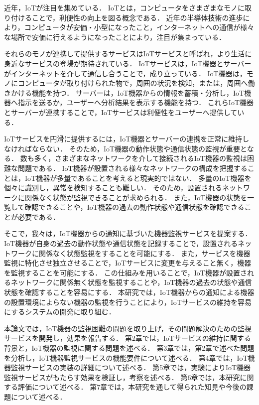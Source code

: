 
近年，IoTが注目を集めている．
IoTとは，コンピュータをさまざまなモノに取り付けることで，利便性の向上を図る概念である．
近年の半導体技術の進歩により，コンピュータが安価・小型になったこと，インターネットへの通信が様々な場所で安価に行えるようになったことにより，注目が集まっている．
\medskip

それらのモノが連携して提供するサービスはIoTサービスと呼ばれ，より生活に身近なサービスの登場が期待されている．
IoTサービスは，IoT機器とサーバーがインターネットを介して通信し合うことで，成り立っている．
IoT機器は，モノにコンピュータが取り付けられた物で，周囲の状況を検知，または，周囲へ働きかける機能を持つ．
サーバーは，IoT機器からの情報を蓄積・分析し，IoT機器へ指示を送るか，ユーザーへ分析結果を表示する機能を持つ．
これらIoT機器とサーバーが連携することで，IoTサービスは利便性をユーザーへ提供している．
\medskip

IoTサービスを円滑に提供するには，IoT機器とサーバーの連携を正常に維持しなければならない．
そのため，IoT機器の動作状態や通信状態の監視が重要となる．
数も多く，さまざまなネットワークを介して接続されるIoT機器の監視は困難な問題である．
IoT機器が設置される様々なネットワークの構成を把握することは，IoT機器が多量であることを考えると現実的ではない．
多量のIoT機器を個々に識別し，異常を検知することも難しい．
そのため，設置されるネットワークに関係なく状態が監視できることが求められる．
また，IoT機器の状態を一覧して確認できることや，IoT機器の過去の動作状態や通信状態を確認できることが必要である．
\medskip

そこで，我々は，IoT機器からの通知に基づいた機器監視サービスを提案する．
IoT機器が自身の過去の動作状態や通信状態を記録することで，設置されるネットワークに関係なく状態監視をすることを可能にする．
また，サービスを機器監視に特化させ独立させることで，IoTサービスに変更を与えること無く，機器を監視することを可能にする．
この仕組みを用いることで，IoT機器が設置されるネットワークに関係無く状態を監視することや，IoT機器の過去の状態や通信状態を確認することを容易にする．
本研究では，IoT機器からの通知による機器の設置環境によらない機器の監視を行うことにより，IoTサービスの維持を容易にするシステムの開発に取り組む．
\medskip

本論文では，IoT機器の監視困難の問題を取り上げ，その問題解決のための監視サービスを開発し，効果を報告する．
第2章では，IoTサービスの維持に関する背景と，IoT機器の監視に関する問題を述べる．
第3章では，第2章で述べた問題を分析し，IoT機器監視サービスの機能要件について述べる．
第4章では，IoT機器監視サービスの実装の詳細について述べる．
第5章では，実験によりIoT機器監視サービスがもたらす効果を検証し，考察を述べる．
第6章では，本研究に関する評価について述べる．
第7章では，本研究を通して得られた知見や今後の課題について述べる．


